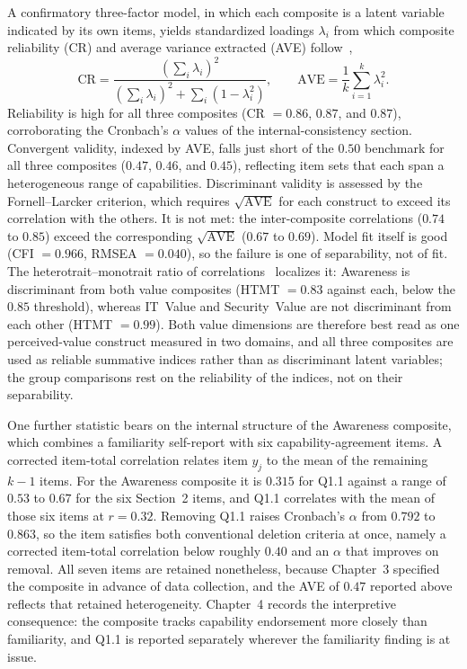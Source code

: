 A confirmatory three-factor model, in which each composite is a latent variable indicated by its own items, yields standardized loadings $\lambda_i$ from which composite reliability (CR) and average variance extracted (AVE) follow~\parencite{Fornell_Larcker_1981},
\begin{equation}
  \mathrm{CR} = \frac{\left(\sum_{i} \lambda_i\right)^2}{\left(\sum_{i} \lambda_i\right)^2 + \sum_{i} \left(1-\lambda_i^2\right)},
  \qquad
  \mathrm{AVE} = \frac{1}{k}\sum_{i=1}^{k}\lambda_i^2 .
\end{equation}
Reliability is high for all three composites (CR $=0.86$, $0.87$, and $0.87$), corroborating the Cronbach's $\alpha$ values of the internal-consistency section. Convergent validity, indexed by AVE, falls just short of the $0.50$ benchmark for all three composites ($0.47$, $0.46$, and $0.45$), reflecting item sets that each span a heterogeneous range of capabilities. Discriminant validity is assessed by the Fornell--Larcker criterion, which requires $\sqrt{\mathrm{AVE}}$ for each construct to exceed its correlation with the others. It is not met: the inter-composite correlations ($0.74$ to $0.85$) exceed the corresponding $\sqrt{\mathrm{AVE}}$ ($0.67$ to $0.69$). Model fit itself is good (CFI $=0.966$, RMSEA $=0.040$), so the failure is one of separability, not of fit. The heterotrait--monotrait ratio of correlations~\parencite{Henseler_Ringle_Sarstedt_2015} localizes it: Awareness is discriminant from both value composites (HTMT $=0.83$ against each, below the $0.85$ threshold), whereas IT~Value and Security~Value are not discriminant from each other (HTMT $=0.99$). Both value dimensions are therefore best read as one perceived-value construct measured in two domains, and all three composites are used as reliable summative indices rather than as discriminant latent variables; the group comparisons rest on the reliability of the indices, not on their separability.

One further statistic bears on the internal structure of the Awareness composite, which combines a familiarity self-report with six capability-agreement items. A corrected item-total correlation relates item $y_j$ to the mean of the remaining $k-1$ items. For the Awareness composite it is $0.315$ for Q1.1 against a range of $0.53$ to $0.67$ for the six Section~2 items, and Q1.1 correlates with the mean of those six items at $r=0.32$. Removing Q1.1 raises Cronbach's $\alpha$ from $0.792$ to $0.863$, so the item satisfies both conventional deletion criteria at once, namely a corrected item-total correlation below roughly $0.40$ and an $\alpha$ that improves on removal. All seven items are retained nonetheless, because Chapter~3 specified the composite in advance of data collection, and the AVE of $0.47$ reported above reflects that retained heterogeneity. Chapter~4 records the interpretive consequence: the composite tracks capability endorsement more closely than familiarity, and Q1.1 is reported separately wherever the familiarity finding is at issue.


